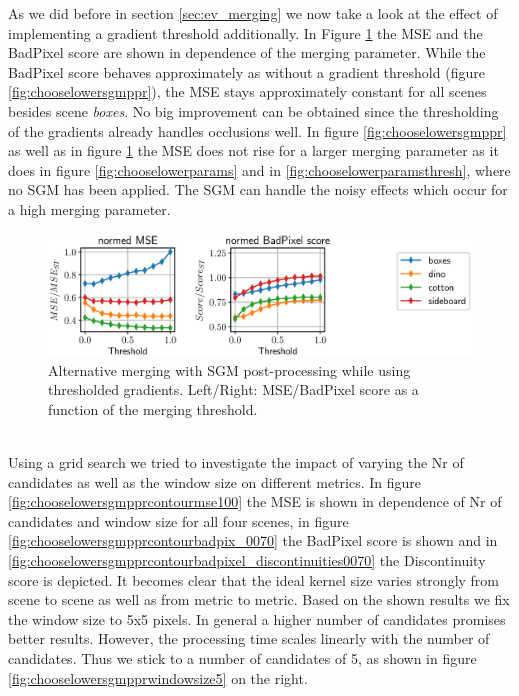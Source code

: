 \documentclass  [
  paper    = a4,
  BCOR     = 10mm,
  twoside,
  fontsize = 12pt,
  fleqn,
  toc      = bibnumbered,
  toc      = listofnumbered,
  numbers  = noendperiod,
  headings = normal,
  listof   = leveldown,
  version  = 3.03
]                                       {scrreprt}
\begin{document}
As we did before in section \ref{sec:ev_merging} we now take a look at the effect of implementing a gradient threshold additionally. In Figure \ref{fig:chooselowersgmpprthresh} the MSE and the BadPixel score are shown in dependence of the merging parameter. While the BadPixel score behaves approximately as without a gradient threshold (figure \ref{fig:chooselowersgmppr}), the MSE stays approximately constant for all scenes besides scene \textit{boxes}. No big improvement can be obtained since the thresholding of the gradients already handles occlusions well. 
In figure \ref{fig:chooselowersgmppr} as well as in figure \ref{fig:chooselowersgmpprthresh} the MSE does not rise for a larger merging parameter as it does in figure \ref{fig:chooselowerparams} and in \ref{fig:chooselowerparamsthresh}, where no SGM has been applied. The SGM can handle the noisy effects which occur for a high merging parameter.
\begin{figure}[h!]
	\centering
	\includegraphics[width=1\linewidth]{images/choose_lower_sgm_ppr_thresh}
	\caption[Alternative merging with SGM post-processing with thresholded gradients]{Alternative merging with SGM post-processing while using thresholded gradients. Left/Right: MSE/BadPixel score as a function of the merging threshold.}
	\label{fig:chooselowersgmpprthresh}
\end{figure}
\ \\
Using a grid search we tried to investigate the impact of varying the Nr of candidates as well as the window size on different metrics. In figure \ref{fig:chooselowersgmpprcontourmse100} the MSE is shown in dependence of Nr of candidates and window size for all four scenes, in figure \ref{fig:chooselowersgmpprcontourbadpix_0070} the BadPixel score is shown and in \ref{fig:chooselowersgmpprcontourbadpixel_discontinuities0070} the Discontinuity score is depicted. It becomes clear that the ideal kernel size varies strongly from scene to scene as well as from metric to metric. Based on the shown results we fix the window size to 5x5 pixels. In general a higher number of candidates promises better results. However, the processing time scales linearly with the number of candidates. Thus we stick to a number of candidates of 5, as shown in figure \ref{fig:chooselowersgmpprwindowsize5} on the right.
\end{document}
